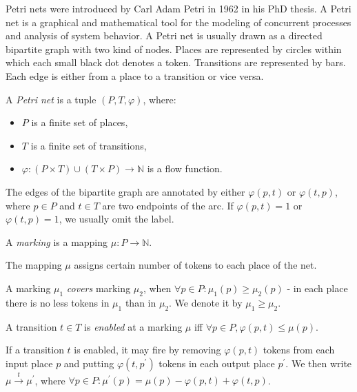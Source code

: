 Petri nets \cite{Petri62,Yen06PetriNets} were introduced by Carl Adam Petri in 1962 in his PhD thesis. A Petri net is a graphical and mathematical tool for the modeling of concurrent processes and analysis of system behavior. A Petri net is usually drawn as a directed bipartite graph with two kind of nodes. Places are represented by circles within which each small black dot denotes a token. Transitions are represented by bars. Each edge is either from a place to a transition or vice versa.

\begin{definition}
  A {\em Petri net} is a tuple $(P, T, \varphi)$, where:
  \begin{itemize}
    \item $P$ is a finite set of places,
    \item $T$ is a finite set of transitions,
    \item $\varphi: (P\times T)\cup(T\times P)\rightarrow \mathbb N$ is a flow function.
  \end{itemize}
\end{definition}

The edges of the bipartite graph are annotated by either $\varphi(p,t)$ or $\varphi(t,p)$, where $p\in P$ and $t\in T$ are two endpoints of the arc. If $\varphi(p,t)=1$ or $\varphi(t,p)=1$, we usually omit the label.

\begin{definition}
  A {\em marking} is a mapping $\mu: P\rightarrow \mathbb N$.
\end{definition}

The mapping $\mu$ assigns certain number of tokens to each place of the net.

\begin{definition}
  A marking $\mu_1$ {\em covers} marking $\mu_2$, when $\forall p\in P: \mu_1(p)\geq\mu_2(p)$ - in each place there is no less tokens in $\mu_1$ than in $\mu_2$. We denote it by $\mu_1\geq\mu_2$.
\end{definition} 

\begin{definition}
  A transition $t\in T$ is {\em enabled} at a marking $\mu$ iff $\forall p\in P, \varphi(p,t)\leq\mu(p)$.
\end{definition}

If a transition $t$ is enabled, it may fire by removing $\varphi(p,t)$ tokens from each input place $p$ and putting $\varphi(t,p^\prime)$ tokens in each output place $p^\prime$. We then write $\mu\xrightarrow{t} \mu^\prime$, where $\forall p\in P: \mu^\prime(p) = \mu(p)-\varphi(p,t)+\varphi(t,p)$.

